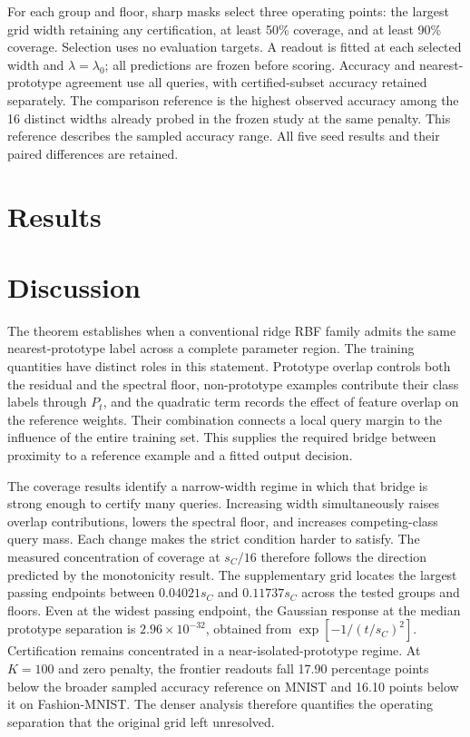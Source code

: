\documentclass[preprint,12pt]{elsarticle}
\begin{document}
For each group and floor, sharp masks select three operating points: the largest grid width retaining any certification, at least 50\% coverage, and at least 90\% coverage. Selection uses no evaluation targets. A readout is fitted at each selected width and $\lambda=\lambda_0$; all predictions are frozen before scoring. Accuracy and nearest-prototype agreement use all queries, with certified-subset accuracy retained separately. The comparison reference is the highest observed accuracy among the 16 distinct widths already probed in the frozen study at the same penalty. This reference describes the sampled accuracy range. All five seed results and their paired differences are retained.

\section{Results}



\section{Discussion}
The theorem establishes when a conventional ridge RBF family admits the same nearest-prototype label across a complete parameter region. The training quantities have distinct roles in this statement. Prototype overlap controls both the residual and the spectral floor, non-prototype examples contribute their class labels through $P_t$, and the quadratic term records the effect of feature overlap on the reference weights. Their combination connects a local query margin to the influence of the entire training set. This supplies the required bridge between proximity to a reference example and a fitted output decision.

The coverage results identify a narrow-width regime in which that bridge is strong enough to certify many queries. Increasing width simultaneously raises overlap contributions, lowers the spectral floor, and increases competing-class query mass. Each change makes the strict condition harder to satisfy. The measured concentration of coverage at $s_C/16$ therefore follows the direction predicted by the monotonicity result. The supplementary grid locates the largest passing endpoints between $0.04021s_C$ and $0.11737s_C$ across the tested groups and floors. Even at the widest passing endpoint, the Gaussian response at the median prototype separation is $2.96\times10^{-32}$, obtained from $\exp[-1/(t/s_C)^2]$. Certification remains concentrated in a near-isolated-prototype regime. At $K=100$ and zero penalty, the frontier readouts fall 17.90 percentage points below the broader sampled accuracy reference on MNIST and 16.10 points below it on Fashion-MNIST. The denser analysis therefore quantifies the operating separation that the original grid left unresolved.
\end{document}
